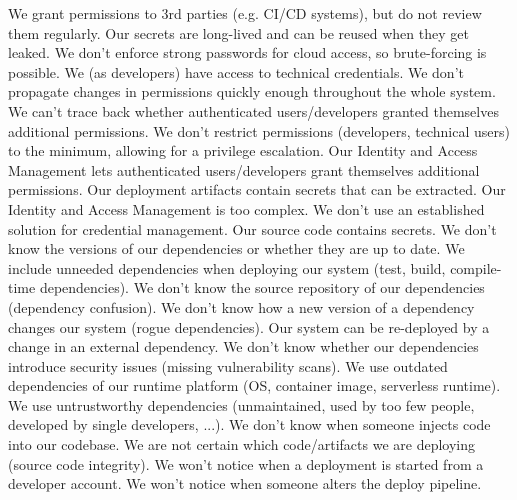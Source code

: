 %

% 
 {We grant permissions to 3rd parties (e.g. CI/CD systems), but do not review them regularly.}
 {Our secrets are long-lived and can be reused when they get leaked.}
 {We don't enforce strong passwords for cloud access, so brute-forcing is possible.}
 {We (as developers) have access to technical credentials.}
 {We don't propagate changes in permissions quickly enough throughout the whole system.}
 {We can't trace back whether authenticated users/developers granted themselves additional permissions.}
 {We don't restrict permissions (developers, technical users) to the minimum, allowing for a privilege escalation.}
 {Our Identity and Access Management lets authenticated users/developers grant themselves additional permissions.}
 {Our deployment artifacts contain secrets that can be extracted.}
 {Our Identity and Access Management is too complex.}
 {We don't use an established solution for credential management.}
 {Our source code contains secrets.}
%
 {We don't know the versions of our dependencies or whether they are up to date.}
 {We include unneeded dependencies when deploying our system (test, build, compile-time dependencies).}
 {We don't know the source repository of our dependencies (dependency confusion).}
 {We don't know how a new version of a dependency changes our system (rogue dependencies).}
 {Our system can be re-deployed by a change in an external dependency.}
 {We don't know whether our dependencies introduce security issues (missing vulnerability scans).}
 {We use outdated dependencies of our runtime platform (OS, container image, serverless runtime).}
 {We use untrustworthy dependencies (unmaintained, used by too few people, developed by single developers, ...).}
 {We don't know when someone injects code into our codebase.}
 {We are not certain which code/artifacts we are deploying (source code integrity).}
 {We won't notice when a deployment is started from a developer account.}
 {We won't notice when someone alters the deploy pipeline.}
